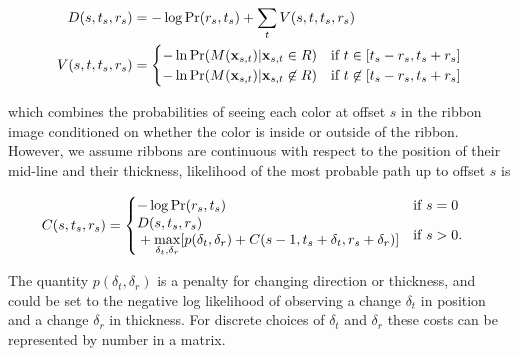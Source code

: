 \begin{align}
D(s, t_s, r_s) &= -\log \Pr(r_s, t_s)  + \sum_{t} V(s,t, t_s, r_s) \\
V(s, t, t_s, r_s) &= 
\begin{cases}
 -\ln\Pr(M(\mathbf{x}_{s,t})|\mathbf{x}_{s,t} \in R) &\text{if } t\in [t_s-r_s, t_s+r_s]\\
 -\ln\Pr(M(\mathbf{x}_{s,t})|\mathbf{x}_{s,t}\not\in R) &\text{if } t\not\in[t_s-r_s, t_s+r_s]
\end{cases}
\end{align}

which combines the probabilities of seeing each color at offset $s$ in the ribbon image conditioned on whether the color is inside or outside of the ribbon.
However, we assume ribbons are continuous with respect to the position of their mid-line and their thickness, likelihood of the most probable path up to offset $s$ is 

\begin{align}
C(s, t_s, r_s) &=  \begin{cases}
-\log \Pr(r_s, t_s) & \text{if } s = 0\\
   \begin{aligned}
   & D(s, t_s, r_s) \\ 
   & + \displaystyle\max_{\delta_t,\delta_r} [p(\delta_t, \delta_r)+C(s-1, t_s+\delta_t, r_s+\delta_r)]
   \end{aligned} & \text{if } s > 0.\\
\end{cases}
\end{align}

The quantity $p(\delta_t, \delta_r)$ is a penalty for changing direction or thickness, and could be set to the negative log likelihood of observing a change $\delta_t$ in position and a change $\delta_r$ in thickness. 
For discrete choices of $\delta_t$ and $\delta_r$ these costs can be represented by number in a matrix.




